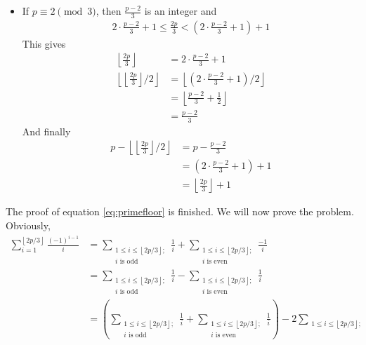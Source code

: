 \documentclass{subfile}
\begin{document}
\begin{solution}
\begin{itemize}
			\item If $p \equiv 2 \pmod 3$, then $\frac{p-2}{3}$ is an integer and
			\begin{align*}
			2\cdot\frac {p - 2}{3} + 1\leq\frac {2p}{3} < \left(2\cdot\frac {p - 2}{3} + 1\right) + 1
			\end{align*}
			This gives
			\begin{align*}
			\left\lfloor\frac {2p}{3}\right\rfloor
				&= 2\cdot\frac {p - 2}{3} + 1\\
			\left\lfloor\left\lfloor\frac {2p}{3}\right\rfloor /2\right\rfloor
				& =	\left\lfloor\left(2\cdot\frac {p - 2}{3} + 1\right)/2\right\rfloor\\
				& = \left\lfloor\frac {p - 2}{3} + \frac {1}{2}\right\rfloor\\
				& = \frac{p-2}{3}
			\end{align*}
			And finally
				\begin{align*}
					p - \left\lfloor\left\lfloor\frac {2p}{3}\right\rfloor /2\right\rfloor
						& = p - \frac {p - 2}{3}\\
						& = \left(2\cdot\frac {p - 2}{3} + 1\right) + 1\\
						& = \left\lfloor\frac {2p}{3}\right\rfloor + 1
				\end{align*}
		\end{itemize}
		The proof of equation \eqref{eq:primefloor} is finished. We will now prove the problem. Obviously,
			\begin{align*}
				\sum_{i = 1}^{\left\lfloor 2p/3\right\rfloor}\frac {\left( - 1\right)^{i - 1}}{i}
					&= \sum_{\substack{1\leq i\leq \left\lfloor 2p/3\right\rfloor ; \\
						i\text{ is odd}}}\frac {1}{i} + \sum_{\substack{1\leq i\leq \left\lfloor 2p/3\right\rfloor ; \\
						i\text{ is even}}}\frac { - 1}{i} \\
					&= \sum_{\substack{1\leq i\leq \left\lfloor 2p/3\right\rfloor ; \\
							i\text{ is odd}}}\frac {1}{i} - \sum_{\substack{1\leq i\leq \left\lfloor 2p/3\right\rfloor ; \\
							i\text{ is even}}}\frac {1}{i}\\
					&= \left(\sum_{\substack{1\leq i\leq \left\lfloor 2p/3\right\rfloor ; \\
							i\text{ is odd}}}\frac {1}{i} + \sum_{\substack{1\leq i\leq \left\lfloor 2p/3\right\rfloor ; \\
							i\text{ is even}}}\frac {1}{i}\right) - 2\sum_{\substack{1\leq i\leq \left\lfloor 2p/3\right\rfloor ; \\
}}
\end{align*}
\end{solution}
\end{document}
